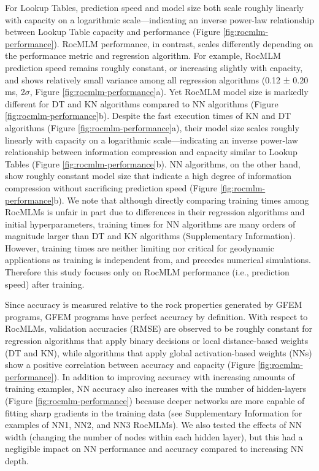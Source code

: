 \documentclass[draft,linenumbers]{agujournal2018}
\begin{document}
For Lookup Tables, prediction speed and model size both scale roughly linearly with capacity on a logarithmic scale---indicating an inverse power-law relationship between Lookup Table capacity and performance (Figure \ref{fig:rocmlm-performance}). RocMLM performance, in contrast, scales differently depending on the performance metric and regression algorithm. For example, RocMLM prediction speed remains roughly constant, or increasing slightly with capacity, and shows relatively small variance among all regression algorithms (0.12 ± 0.20 ms, 2\(\sigma\), Figure \ref{fig:rocmlm-performance}a). Yet RocMLM model size is markedly different for DT and KN algorithms compared to NN algorithms (Figure \ref{fig:rocmlm-performance}b). Despite the fast execution times of KN and DT algorithms (Figure \ref{fig:rocmlm-performance}a), their model size scales roughly linearly with capacity on a logarithmic scale---indicating an inverse power-law relationship between information compression and capacity similar to Lookup Tables (Figure \ref{fig:rocmlm-performance}b). NN algorithms, on the other hand, show roughly constant model size that indicate a high degree of information compression without sacrificing prediction speed (Figure \ref{fig:rocmlm-performance}b). We note that although directly comparing training times among RocMLMs is unfair in part due to differences in their regression algorithms and initial hyperparameters, training times for NN algorithms are many orders of magnitude larger than DT and KN algorithms (Supplementary Information). However, training times are neither limiting nor critical for geodynamic applications as training is independent from, and precedes numerical simulations. Therefore this study focuses only on RocMLM performance (i.e., prediction speed) after training.

Since accuracy is measured relative to the rock properties generated by GFEM programs, GFEM programs have perfect accuracy by definition. With respect to RocMLMs, validation accuracies (RMSE) are observed to be roughly constant for regression algorithms that apply binary decisions or local distance-based weights (DT and KN), while algorithms that apply global activation-based weights (NNs) show a positive correlation between accuracy and capacity (Figure \ref{fig:rocmlm-performance}). In addition to improving accuracy with increasing amounts of training examples, NN accuracy also increases with the number of hidden-layers (Figure \ref{fig:rocmlm-performance}) because deeper networks are more capable of fitting sharp gradients in the training data (see Supplementary Information for examples of NN1, NN2, and NN3 RocMLMs). We also tested the effects of NN width (changing the number of nodes within each hidden layer), but this had a negligible impact on NN performance and accuracy compared to increasing NN depth.
\end{document}
